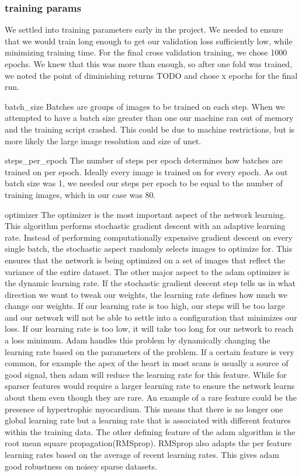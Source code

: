 \documentclass[12pt]{article}
\begin{document}
\subsubsection{training params}
We settled into training parameters early in the project.
We needed to ensure that we would train long enough to get our validation loss sufficiently low, while minimizing training time.
For the final cross validation training, we chose 1000 epochs.
We knew that this was more than enough, so after one fold was trained, we noted the point of diminishing returns TODO and chose x epochs for the final run.

batch\_size
Batches are groups of images to be trained on each step.
When we attempted to have a batch size greater than one our machine ran out of memory and the training script crashed.
This could be due to machine restrictions, but is more likely the large image resolution and size of unet.

steps\_per\_epoch
The number of steps per epoch determines how batches are trained on per epoch.
Ideally every image is trained on for every epoch.
As out batch size was 1, we needed our steps per epoch to be equal to the number of training images, which in our case was 80.

optimizer
The optimizer is the most important aspect of the network learning.
This algorithm performs stochastic gradient descent with an adaptive learning rate.
Instead of performing computationally expensive gradient descent on every single batch, the stochastic aspect randomly selects images to optimize for.
This ensures that the network is being optimized on a set of images that reflect the variance of the entire dataset.
The other major aspect to the adam optimizer is the dynamic learning rate.
If the stochastic gradient descent step tells us in what direction we want to tweak our weights, the learning rate defines how much we change our weights.
If our learning rate is too high, our steps will be too large and our network will not be able to settle into a configuration that minimizes our loss.
If our learning rate is too low, it will take too long for our network to reach a loss minimum.
Adam handles this problem by dynamically changing the learning rate based on the parameters of the problem.
If a certain feature is very common, for example the apex of the heart in most scans is usually a source of good signal, then adam will reduce the learning rate for this feature.
While for sparser features would require a larger learning rate to ensure the network learns about them even though they are rare.
An example of a rare feature could be the presence of hypertrophic myocardium.
This means that there is no longer one global learning rate but a learning rate that is associated with different features within the training data.
The other defining feature of the adam algorithm is the root mean square propagation(RMSprop).
RMSprop also adapts the per feature learning rates based on the average of recent learning rates.
This gives adam good robustness on noisey sparse datasets\cite{adam_opt}.
\end{document}
